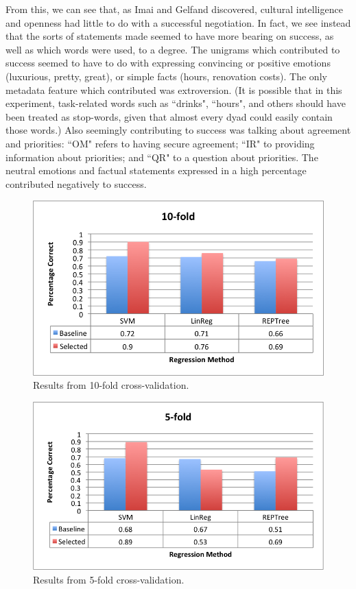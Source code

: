 \documentclass[11pt]{article} %
\begin{document}
From this, we can see that, as Imai and Gelfand discovered, cultural intelligence and openness had little to do with a successful negotiation.  In fact, we see instead that the sorts of statements made seemed to have more bearing on success, as well as which words were used, to a degree.  The unigrams which contributed to success seemed to have to do with expressing convincing or positive emotions (luxurious, pretty, great), or simple facts (hours, renovation costs).  The only metadata feature which contributed was extroversion.  (It is possible that in this experiment, task-related words such as ``drinks", ``hours", and others should have been treated as stop-words, given that almost every dyad could easily contain those words.)  Also seemingly contributing to success was talking about agreement and priorities: ``OM" refers to having secure agreement; ``IR" to providing information about priorities; and ``QR" to a question about priorities.  The neutral emotions and factual statements expressed in a high percentage contributed negatively to success.

\begin{figure}
\includegraphics{../results/10fold.png}
\caption{Results from 10-fold cross-validation.}
\end{figure}
\begin{figure}
\includegraphics{../results/5fold.png}
\caption{Results from 5-fold cross-validation.}
\end{figure}
\end{document}

